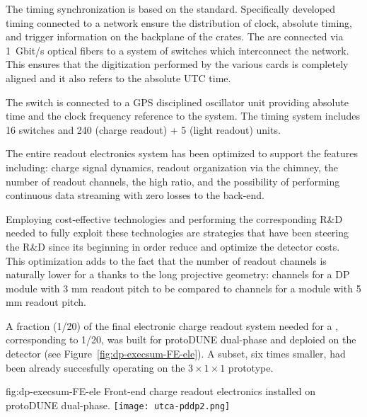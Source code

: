The timing synchronization is based on the  standard. Specifically developed timing  connected to a  network ensure the distribution of clock, absolute timing, and trigger information on the backplane of the  crates. The  are connected via \SI{1}{Gbit/s} optical fibers to a system of  switches which interconnect the  network. This ensures that the digitization performed by the various  cards is completely aligned and it also refers to the absolute UTC time. 

The  switch is connected to a GPS disciplined oscillator unit providing absolute time and the clock frequency reference to the system. The timing system includes \num{16}  switches and \num{240} (charge readout) + \num{5} (light readout)  units.    

The entire readout electronics system has been optimized to support the \dual features including: charge signal dynamics, readout organization via the chimney, the number of readout channels, the high  ratio, and the possibility of performing continuous data streaming with zero losses to the  back-end. 

Employing cost-effective technologies and performing the corresponding R\&D needed to fully exploit these technologies are strategies that have been steering the R\&D since its beginning in order reduce and optimize the detector costs.   
This optimization adds to the fact that the number of readout channels is naturally lower for a  thanks to the long projective geometry: \dpnumcrpch channels for a DP module with 3 mm readout pitch to be compared to \spnumch channels for a \single module with 5 mm readout pitch. 

A fraction (1/20) of the final electronic charge readout system needed for a   , corresponding to 1/20, was built for protoDUNE dual-phase and deploied on the detector (see Figure~\ref{fig:dp-execsum-FE-ele}).  A subset, six times smaller, had been already succesfully operating on the $3\times 1 \times 1$ prototype.

\begin{dunefigure}{fig:dp-execsum-FE-ele}
  {Front-end charge readout electronics installed on protoDUNE dual-phase.}
 \texttt{[image: utca-pddp2.png]}
\end{dunefigure}

